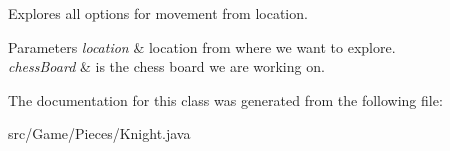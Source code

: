 Explores all options for movement from location. 
\begin{DoxyParams}{Parameters}
{\em location} & location from where we want to explore. \\
\hline
{\em chess\+Board} & is the chess board we are working on. \\
\hline
\end{DoxyParams}


The documentation for this class was generated from the following file\+:\begin{DoxyCompactItemize}
\item 
src/\+Game/\+Pieces/Knight.\+java\end{DoxyCompactItemize}
